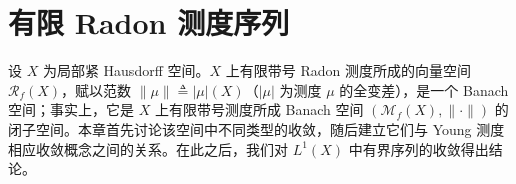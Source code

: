 \documentclass[../main.tex]{subfiles}
\begin{document}
\chapter{有限 Radon 测度序列}\label{chapter:ch05}

设 $X$ 为局部紧 Hausdorff 空间。$X$ 上有限带号 Radon 测度所成的向量空间 $\mathscr{R}_f(X)$，赋以范数 $\|\mu\|\triangleq |\mu|(X)$（$|\mu|$ 为测度 $\mu$ 的全变差），是一个 Banach 空间；事实上，它是 $X$ 上有限带号测度所成 Banach 空间 $(\mathcal{M}_f(X),\|\cdot\|)$ 的闭子空间。本章首先讨论该空间中不同类型的收敛，随后建立它们与 Young 测度相应收敛概念之间的关系。在此之后，我们对 $L^1(X)$ 中有界序列的收敛得出结论。







\end{document}
